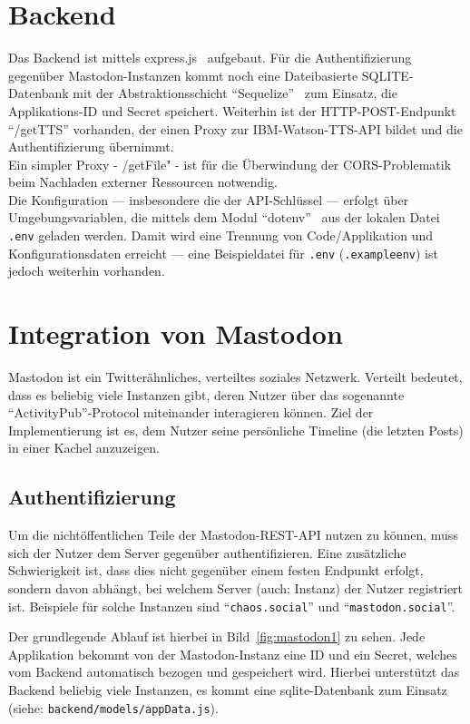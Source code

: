 \documentclass[fleqn,10pt]{SelfArx} %
\begin{document}
\section{Backend}
Das Backend ist mittels express.js~\cite{express} aufgebaut. Für die Authentifizierung gegenüber Mastodon-Instanzen kommt noch eine Dateibasierte SQLITE-Datenbank mit der Abstraktionsschicht \enquote{Sequelize}~\cite{sequelize} zum Einsatz, die Applikations-ID und Secret speichert. Weiterhin ist der HTTP-POST-Endpunkt \enquote{/getTTS} vorhanden, der einen Proxy zur IBM-Watson-TTS-API bildet und die Authentifizierung übernimmt. \\
Ein simpler Proxy - /getFile" - ist für die Überwindung der CORS-Problematik beim Nachladen externer Ressourcen notwendig. \\
Die Konfiguration --- insbesondere die der API-Schlüssel --- erfolgt über Umgebungsvariablen, die mittels dem Modul \enquote{dotenv}~\cite{dotenv} aus der lokalen Datei \texttt{.env} geladen werden. Damit wird eine Trennung von Code/Applikation und Konfigurationsdaten erreicht --- eine Beispieldatei für \texttt{.env} (\texttt{.exampleenv}) ist jedoch weiterhin vorhanden. \\
\section{Integration von Mastodon}
Mastodon ist ein Twitterähnliches, verteiltes soziales Netzwerk. Verteilt bedeutet, dass es beliebig viele Instanzen gibt, deren Nutzer über das sogenannte \enquote{ActivityPub}-Protocol miteinander interagieren können. Ziel der Implementierung ist es, dem Nutzer seine persönliche Timeline (die letzten Posts) in einer Kachel anzuzeigen.
\subsection{Authentifizierung}
Um die nichtöffentlichen Teile der Mastodon-REST-API nutzen zu können, muss sich der Nutzer dem Server gegenüber authentifizieren. Eine zusätzliche Schwierigkeit ist, dass dies nicht gegenüber einem festen Endpunkt erfolgt, sondern davon abhängt, bei welchem Server (auch: Instanz) der Nutzer registriert ist. Beispiele für solche Instanzen sind \enquote{\texttt{chaos.social}} und \enquote{\texttt{mastodon.social}}.

Der grundlegende Ablauf ist hierbei in Bild~\ref{fig:mastodon1} zu sehen. Jede Applikation bekommt von der Mastodon-Instanz eine ID und ein Secret, welches vom Backend automatisch bezogen und gespeichert wird. Hierbei unterstützt das Backend beliebig viele Instanzen, es kommt eine sqlite-Datenbank zum Einsatz (siehe: \texttt{backend/models/appData.js}).
\end{document}
